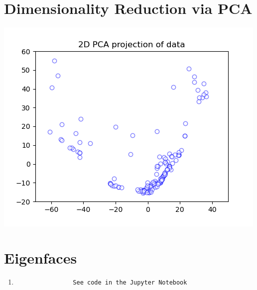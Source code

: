 \documentclass[12pt]{article}
\begin{document}
\begin{enumerate}
\begin{enumerate}
	
	

	

	
\end{enumerate}

\end{enumerate}

\newpage

\section{Dimensionality Reduction via PCA}

	\begin{center}
		\includegraphics{q2_scatterplot}
	\end{center}
	

\section{Eigenfaces}
	\begin{enumerate}
		\item
			\begin{verbatim}
				See code in the Jupyter Notebook
			\end{verbatim}
	\end{enumerate}
\end{document}
